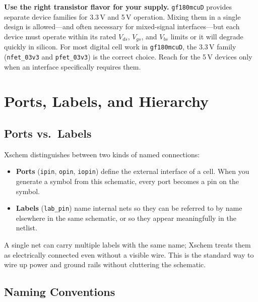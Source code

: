 \documentclass[11pt]{article}
\begin{document}
\begin{tipbox}
\textbf{Use the right transistor flavor for your supply.}
\texttt{gf180mcuD} provides separate device families for 3.3\,V and
5\,V operation.
Mixing them in a single design is allowed---and often necessary for
mixed-signal interfaces---but each device must operate within its rated
\(V_{ds}\), \(V_{gs}\), and \(V_{bs}\) limits or it will degrade quickly
in silicon.
For most digital cell work in \texttt{gf180mcuD}, the 3.3\,V family
(\texttt{nfet\_03v3} and \texttt{pfet\_03v3}) is the correct choice.
Reach for the 5\,V devices only when an interface specifically requires
them.
\end{tipbox}

\section{Ports, Labels, and Hierarchy}

\subsection{Ports vs.\ Labels}

Xschem distinguishes between two kinds of named connections:

\begin{itemize}[leftmargin=2em]
  \item \textbf{Ports} (\texttt{ipin}, \texttt{opin}, \texttt{iopin})
        define the external interface of a cell.
        When you generate a symbol from this schematic, every port
        becomes a pin on the symbol.
  \item \textbf{Labels} (\texttt{lab\_pin}) name internal nets so they
        can be referred to by name elsewhere in the same schematic, or
        so they appear meaningfully in the netlist.
\end{itemize}

A single net can carry multiple labels with the same name; Xschem
treats them as electrically connected even without a visible wire.
This is the standard way to wire up power and ground rails without
cluttering the schematic.

\subsection{Naming Conventions}
\end{document}
